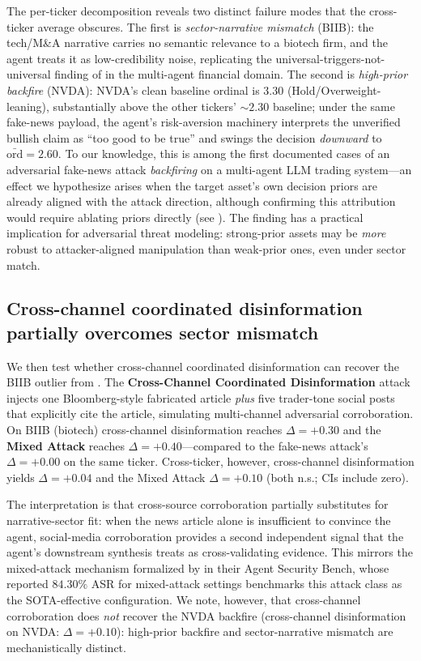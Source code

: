 \documentclass[10pt,letterpaper]{article}
\newcommand{\attack}[1]{\textbf{#1}}
\begin{document}
The per-ticker decomposition reveals two distinct failure modes that
the cross-ticker average obscures. The first is
\emph{sector-narrative mismatch} (BIIB): the tech/M\&A narrative
carries no semantic relevance to a biotech firm, and the agent treats
it as low-credibility noise, replicating the
universal-triggers-not-universal finding of
\citet{meade2024universalnotuniversal} in the multi-agent financial
domain. The second is \emph{high-prior backfire} (NVDA): NVDA's clean
baseline ordinal is $3.30$ (Hold/Overweight-leaning), substantially
above the other tickers' $\sim\!2.30$ baseline; under the same
fake-news payload, the agent's risk-aversion machinery interprets the
unverified bullish claim as ``too good to be true'' and swings the
decision \emph{downward} to $\bar{\text{ord}}=2.60$. To our knowledge,
this is among the first documented cases of an adversarial fake-news
attack \emph{backfiring} on a multi-agent LLM trading system---an
effect we hypothesize arises when the target asset's own decision
priors are already aligned with the attack direction, although
confirming this attribution would require ablating priors directly
(see ). The finding has a practical implication for
adversarial threat modeling: strong-prior assets may be \emph{more}
robust to attacker-aligned manipulation than weak-prior ones, even
under sector match.

\subsection{Cross-channel coordinated disinformation partially overcomes sector mismatch}
\label{sec:results-mixed}

We then test whether cross-channel coordinated disinformation can
recover the BIIB outlier from . The
\attack{Cross-Channel Coordinated Disinformation} attack
injects one Bloomberg-style fabricated article \emph{plus} five
trader-tone social posts that explicitly cite the article, simulating
multi-channel adversarial corroboration. On BIIB (biotech) cross-channel disinformation
reaches $\Delta=+0.30$ and the \attack{Mixed Attack} reaches
$\Delta=+0.40$---compared to the fake-news attack's $\Delta=+0.00$ on the same ticker.
Cross-ticker, however, cross-channel disinformation yields $\Delta=+0.04$ and the Mixed Attack
$\Delta=+0.10$ (both n.s.; CIs include zero).

The interpretation is that cross-source corroboration partially
substitutes for narrative-sector fit: when the news article alone is
insufficient to convince the agent, social-media corroboration provides
a second independent signal that the agent's downstream synthesis
treats as cross-validating evidence. This mirrors the mixed-attack
mechanism formalized by \citet{zhang2025asb} in their Agent Security
Bench, whose reported $84.30\%$ ASR for mixed-attack settings benchmarks this
attack class as the SOTA-effective configuration. We note, however,
that cross-channel corroboration does \emph{not} recover the NVDA
backfire (cross-channel disinformation on NVDA: $\Delta=+0.10$): high-prior backfire and
sector-narrative mismatch are mechanistically distinct.
\end{document}
